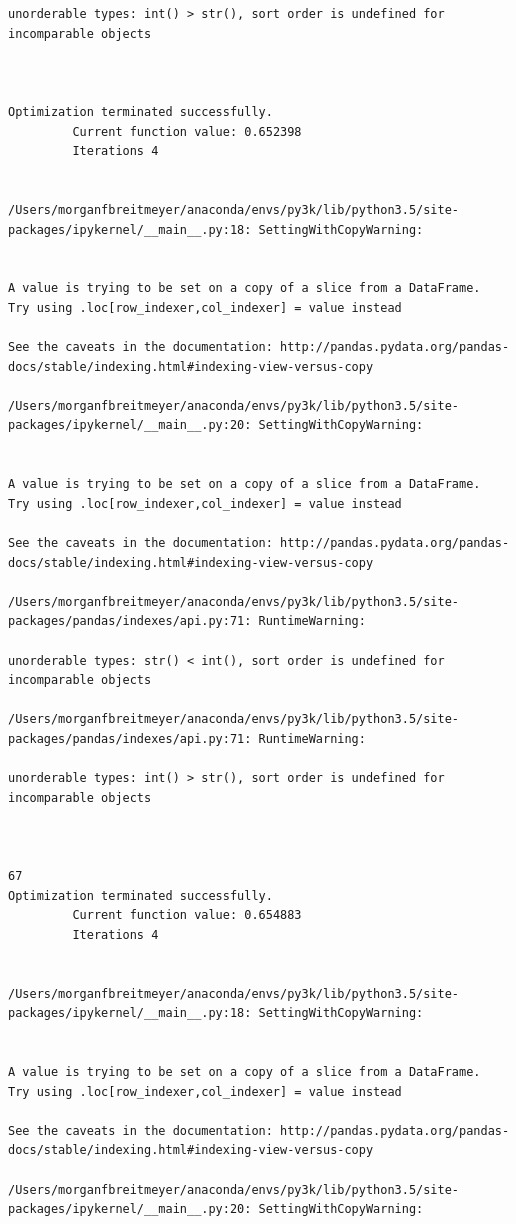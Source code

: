 \begin{lstlisting}
unorderable types: int() > str(), sort order is undefined for incomparable objects



Optimization terminated successfully.
         Current function value: 0.652398
         Iterations 4


/Users/morganfbreitmeyer/anaconda/envs/py3k/lib/python3.5/site-packages/ipykernel/__main__.py:18: SettingWithCopyWarning:


A value is trying to be set on a copy of a slice from a DataFrame.
Try using .loc[row_indexer,col_indexer] = value instead

See the caveats in the documentation: http://pandas.pydata.org/pandas-docs/stable/indexing.html#indexing-view-versus-copy

/Users/morganfbreitmeyer/anaconda/envs/py3k/lib/python3.5/site-packages/ipykernel/__main__.py:20: SettingWithCopyWarning:


A value is trying to be set on a copy of a slice from a DataFrame.
Try using .loc[row_indexer,col_indexer] = value instead

See the caveats in the documentation: http://pandas.pydata.org/pandas-docs/stable/indexing.html#indexing-view-versus-copy

/Users/morganfbreitmeyer/anaconda/envs/py3k/lib/python3.5/site-packages/pandas/indexes/api.py:71: RuntimeWarning:

unorderable types: str() < int(), sort order is undefined for incomparable objects

/Users/morganfbreitmeyer/anaconda/envs/py3k/lib/python3.5/site-packages/pandas/indexes/api.py:71: RuntimeWarning:

unorderable types: int() > str(), sort order is undefined for incomparable objects



67
Optimization terminated successfully.
         Current function value: 0.654883
         Iterations 4


/Users/morganfbreitmeyer/anaconda/envs/py3k/lib/python3.5/site-packages/ipykernel/__main__.py:18: SettingWithCopyWarning:


A value is trying to be set on a copy of a slice from a DataFrame.
Try using .loc[row_indexer,col_indexer] = value instead

See the caveats in the documentation: http://pandas.pydata.org/pandas-docs/stable/indexing.html#indexing-view-versus-copy

/Users/morganfbreitmeyer/anaconda/envs/py3k/lib/python3.5/site-packages/ipykernel/__main__.py:20: SettingWithCopyWarning:



\end{lstlisting}
